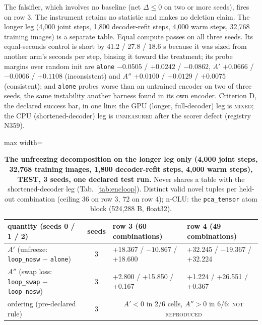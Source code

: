 \documentclass{article} %
\begin{document}
\noindent The falsifier, which involves no baseline (net $\Delta\le0$ on two or more seeds), fires on
row 3.
The instrument retains no statistic and makes no deletion claim. %
The longer leg (4,000 joint steps, 1,800 decoder-refit steps, 4,000 warm steps, 32,768 training
images) is a separate table. Equal compute passes on all three seeds. Its equal-seconds control is
short by 41.2 / 27.8 / 18.6 s because it was sized from another arm's seconds per step, biasing it
toward the treatment; its probe margins over random init are \texttt{alone} $-0.0505$ / $+0.0242$ /
$-0.0862$, $A'$ $+0.0666$ / $-0.0066$ / $+0.1108$ (inconsistent) and $A''$ $+0.0100$ / $+0.0129$ /
$+0.0075$ (consistent); and \texttt{alone} probes worse than an untrained encoder on two of three
seeds, the same instability another harness found in its own encoder. %
Criterion D, the declared success bar, in one line: the GPU (longer, full-decoder) leg is \textsc{mixed}; the CPU (shortened-decoder) leg is \textsc{unmeasured} after the scorer defect (registry N359). %

\begin{table}[h]
\centering\small
\caption{\textbf{The unfreezing decomposition on the longer leg only (4,000 joint steps, %
32,768 training images, 1,800 decoder-refit steps, 4,000 warm steps), TEST, 3 seeds, %
one declared test run.} Never shares a table with the shortened-decoder leg
(Tab.~\ref{tab:encloop}). Distinct valid novel tuples per held-out combination (ceiling 36 on row 3, 72 on
row 4); n-CLU: the \texttt{pca\_tensor} atom block (524,288 B, float32).} %
\label{tab:bard-gpu}
\setlength{\tabcolsep}{2.4pt}
\begin{adjustbox}{max width=\linewidth}\begin{tabular}{lcp{4.6cm}p{4.6cm}}
\toprule
quantity (seeds 0 / 1 / 2) & seeds & row 3 (60 combinations) & row 4 (49 combinations) \\ %
\midrule
$A'$ (unfreeze: \texttt{loop\_nosw} $-$ \texttt{alone}) & 3 & +18.367 / $-10.867$ / +18.600 & +32.245 / $-19.367$ / +32.224 \\
$A''$ (swap loss: \texttt{loop\_swap} $-$ \texttt{loop\_nosw}) & 3 & +2.800 / +15.850 / +0.167 & +1.224 / +26.551 / +0.367 \\
ordering (pre-declared rule) & 3 & \multicolumn{2}{c}{$A'<0$ in 2/6 cells, $A''>0$ in 6/6: \textsc{not reproduced}} \\
\bottomrule
\end{tabular}\end{adjustbox}
\end{table}
\end{document}
